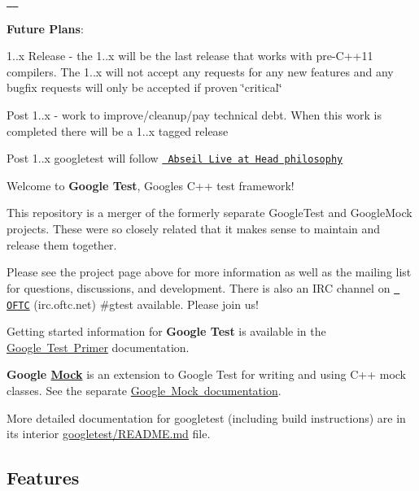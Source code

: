 \href{https://travis-ci.org/google/googletest}{\texttt{ }} \href{https://ci.appveyor.com/project/GoogleTestAppVeyor/googletest/branch/master}{\texttt{ }}

{\bfseries{Future Plans}}\+:
\begin{DoxyItemize}
\item 1..\+x Release -\/ the 1..\+x will be the last release that works with pre-\/\+C++11 compilers. The 1..\+x will not accept any requests for any new features and any bugfix requests will only be accepted if proven \char`\"{}critical\char`\"{}
\item Post 1..\+x -\/ work to improve/cleanup/pay technical debt. When this work is completed there will be a 1..\+x tagged release
\item Post 1..\+x googletest will follow \href{https://abseil.io/about/philosophy}{\texttt{ Abseil Live at Head philosophy}}
\end{DoxyItemize}

Welcome to {\bfseries{Google Test}}, Google\textquotesingle{}s C++ test framework!

This repository is a merger of the formerly separate Google\+Test and Google\+Mock projects. These were so closely related that it makes sense to maintain and release them together.

Please see the project page above for more information as well as the mailing list for questions, discussions, and development. There is also an I\+RC channel on \href{https://webchat.oftc.net/}{\texttt{ O\+F\+TC}} (irc.\+oftc.\+net) \#gtest available. Please join us!

Getting started information for {\bfseries{Google Test}} is available in the \mbox{\hyperlink{_obj__test_2lib_2googletest-release-1_88_81_2googletest_2docs_2primer_8md}{Google Test Primer}} documentation.

{\bfseries{Google \mbox{\hyperlink{class_mock}{Mock}}}} is an extension to Google Test for writing and using C++ mock classes. See the separate \mbox{\hyperlink{_obj__test_2lib_2googletest-release-1_88_81_2googlemock_2_r_e_a_d_m_e_8md}{Google Mock documentation}}.

More detailed documentation for googletest (including build instructions) are in its interior \mbox{\hyperlink{_obj__test_2lib_2googletest-release-1_88_81_2googletest_2_r_e_a_d_m_e_8md}{googletest/\+R\+E\+A\+D\+ME.md}} file.

\subsection*{Features}



